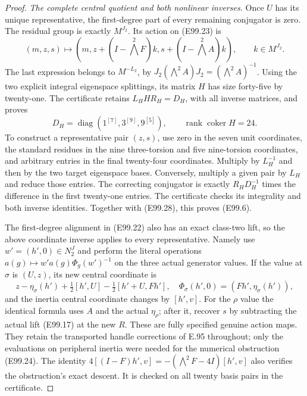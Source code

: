 \begin{proof}
\emph{The complete central quotient and both nonlinear inverses.}
Once $U$ has its unique representative, the first-degree
part of every remaining conjugator is zero. The residual
group is exactly $M^{J_2}$. Its action on (E99.23) is
\[
 (m,z,s)\longmapsto
       (m,z+(I-\bigwedge^2F)k,
                s+(I-\bigwedge^2A)k),\qquad k\in M^{J_2}.
 \tag{E99.29}
\]
The last expression belongs to $M^{-L_2}$, by
$J_2(\bigwedge^2A)J_2=(\bigwedge^2A)^{-1}$.
Using the two explicit integral eigenspace splittings,
its matrix $H$ has size forty-five by twenty-one.
The certificate retains $L_HHR_H=D_H$, with all inverse
matrices, and proves
\[
       D_H=\operatorname{diag}
                    (1^{[7]},3^{[9]},9^{[5]}),
               \qquad \operatorname{rank}\operatorname{coker}H=24.
 \tag{E99.30}
\]
To construct a representative pair $(z,s)$, use zero
in the seven unit coordinates, the standard residues
in the nine three-torsion and five nine-torsion coordinates,
and arbitrary entries in the final twenty-four coordinates.
Multiply by $L_H^{-1}$ and then by the two target
eigenspace bases. Conversely, multiply a given pair
by $L_H$ and reduce those entries. The correcting
conjugator is exactly
$R_H D_H^{-1}$ times the difference in the first
twenty-one entries. The certificate checks its integrality
and both inverse identities. Together with (E99.28),
this proves (E99.6).

The first-degree alignment in (E99.22) also has an exact
class-two lift, so the above coordinate inverse applies
to every representative. Namely use $w'=(h',0)\in N_2^J$
and perform the literal operations
$a(g)\mapsto w'a(g)\Phi_g(w')^{-1}$ on the three actual
generator values. If the value at $\sigma$ is $(U,z)$,
its new central coordinate is
\[
 z-\eta_\sigma(h')+
       \tfrac12[h',U]-\tfrac12[h'+U,Fh'],
 \quad
 \Phi_\sigma(h',0)=(Fh',\eta_\sigma(h')),
 \tag{E99.31}
\]
and the inertia central coordinate changes by $[h',v]$.
For the $\rho$ value the identical formula uses $A$ and
the actual $\eta_\rho$; after it, recover $s$ by subtracting
the actual lift (E99.17) at the new $R$.
These are fully specified genuine action maps. They retain
the transported handle corrections of E.95 throughout;
only the evaluations on peripheral inertia were needed
for the numerical obstruction (E99.24).
The identity
$4[(I-F)h',v]=-(\bigwedge^2F-4I)[h',v]$
also verifies the obstruction's exact descent. It is
checked on all twenty basis pairs in the certificate.


\end{proof}
